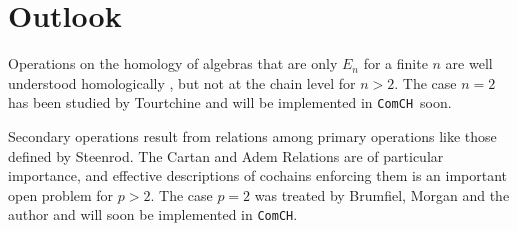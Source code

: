 \documentclass{amsart}
\newcommand{\comch}{\texttt{ComCH}}
\begin{document}
\section{Outlook}

Operations on the homology of algebras that are only $E_n$ for a finite $n$ are well understood homologically \cite{Cohen76}, but not at the chain level for $n>2$. The case $n=2$ has been studied by Tourtchine \cite{Tourtchine06} and will be implemented in \comch\, soon.

Secondary operations result from relations among primary operations like those defined by Steenrod. The Cartan and Adem Relations are of particular importance, and effective descriptions of cochains enforcing them is an important open problem for $p > 2$. The case $p=2$ was treated by Brumfiel, Morgan and the author \cite{medina2020cartan, brumfiel2020cochain} and will soon be implemented in \comch.  



\end{document}
